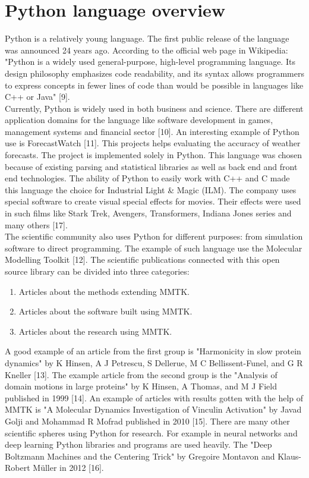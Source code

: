 \documentclass[
  twoside,
  11pt, a4paper,
  footinclude=true,
  headinclude=true,
  cleardoublepage=empty
]{scrreprt}
\begin{document}
        \section{Python language overview}
        Python is a relatively young language. The first public release of the language was announced 24 years ago. According to the official web page in Wikipedia: "Python is a widely used general-purpose, high-level programming language. Its design philosophy emphasizes code readability, and its syntax allows programmers to express concepts in fewer lines of code than would be possible in languages like C++ or Java" [9].\\
        Currently, Python is widely used in both business and science. There are different application domains for the language like software development in games, management systems and financial sector [10]. An interesting example of Python use is ForecastWatch [11]. This projects helps evaluating the accuracy of weather forecasts. The project is implemented solely in Python. This language was chosen because of existing parsing and statistical libraries as well as back end and front end technologies. The ability of Python to easily work with C++ and C made this language the choice for Industrial Light \& Magic (ILM). The company uses special software to create visual special effects for movies. Their effects were used in such films like Stark Trek, Avengers, Transformers, Indiana Jones series and many others [17].\\
        The scientific community also uses Python for different purposes: from simulation software to direct programming. The example of such language use the Molecular Modelling Toolkit [12]. The scientific publications connected with this open source library can be divided into three categories:
        \begin{enumerate}
            \item Articles about the methods extending MMTK.
            \item Articles about the software built using MMTK.
            \item Articles about the research using MMTK.
        \end{enumerate}
        A good example of an article from the first group is "Harmonicity in slow protein dynamics" by K Hinsen, A J Petrescu, S Dellerue, M C Bellissent-Funel, and G R Kneller [13]. The example article from the second group is the "Analysis of domain motions in large proteins" by K Hinsen, A Thomas, and M J Field published in 1999 [14]. An example of articles with results gotten with the help of MMTK is "A Molecular Dynamics Investigation of Vinculin Activation" by Javad Golji and Mohammad R Mofrad published in 2010 [15]. There are many other scientific spheres using Python for research. For example in neural networks and deep learning Python libraries and programs are used heavily. The "Deep Boltzmann Machines and the Centering Trick" by Gregoire Montavon and Klaus-Robert Müller in 2012 [16].\\
\end{document}

